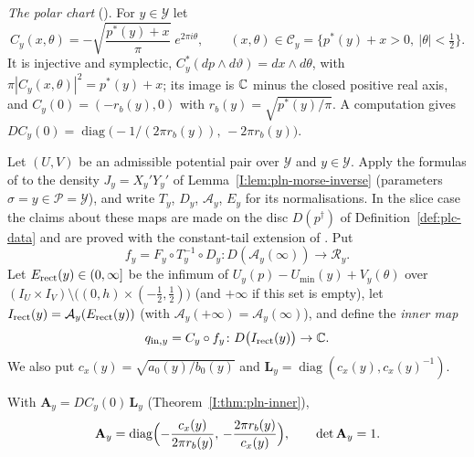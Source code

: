 \emph{The polar chart} (). For $y\in\mathcal Y$ let
\begin{equation}\label{eq:q-pln-chart}
 C_y(x,\theta)=-\sqrt{\frac{p^*(y)+x}\pi}\;e^{2\pi i\theta},\qquad
 (x,\theta)\in\mathcal C_y=\{p^*(y)+x>0,\ |\theta|<\tfrac12\}.
\end{equation}
It is injective and symplectic, $C_y^*(dp\wedge d\vartheta)=dx\wedge d\theta$, with $\pi|C_y(x,\theta)|^2=p^*(y)+x$; its image
is $\mathbb{C}$ minus the closed positive real axis, and $C_y(0)=(-r_b(y),0)$ with $r_b(y)=\sqrt{p^*(y)/\pi}$. A computation gives
$DC_y(0)=\operatorname{diag}\bigl(-1/(2\pi r_b(y)),\,-2\pi r_b(y)\bigr)$.

\begin{definition}\label{I:def:pln-inner-map}
Let $(U,V)$ be an admissible potential pair over $\mathcal Y$ and $y\in\mathcal Y$. Apply
the formulas of  to the density $J_y=X_y'Y_y'$ of Lemma~\ref{I:lem:pln-morse-inverse}
(parameters $\sigma=y\in\mathcal P=\mathcal Y$), and write $T_y$, $D_y$, $\mathcal A_y$, $E_y$ for its normalisations. In the slice case the claims about these maps are made on the disc $D(p^\dagger)$ of Definition~\ref{def:plc-data}
and are proved with the constant-tail extension of . Put
\[
 f_y=F_y\circ T_y^{-1}\circ D_y\colon D(\mathcal A_y(\infty))\to\mathcal R_y .
\]
Let $E_{\rm rect}(y)\in(0,\infty]$ be the infimum of $U_y(p)-U_{\min}(y)+V_y(\theta)$ over
$(I_U\times I_V)\setminus\bigl((0,h)\times(-\frac12,\frac12)\bigr)$ (and $+\infty$ if this set is empty), let
$I_{\rm rect}(y)=\mathcal A_y(E_{\rm rect}(y))$ (with $\mathcal A_y(+\infty)=\mathcal A_y(\infty)$), and define the
\emph{inner map}
\[
 q_{{\rm in},y}=C_y\circ f_y\colon D\bigl(I_{\rm rect}(y)\bigr)\to\mathbb{C} .
\]
We also put $c_x(y)=\sqrt{a_0(y)/b_0(y)}$ and $\mathbf L_y=\operatorname{diag}(c_x(y),c_x(y)^{-1})$.
\end{definition}

With $\mathbf A_y=DC_y(0)\,\mathbf L_y$ (Theorem~\ref{I:thm:pln-inner}),
\begin{equation}\label{eq:q-pln-A0}
 \mathbf A_y=\operatorname{diag}\Bigl(-\frac{c_x(y)}{2\pi r_b(y)},\,-\frac{2\pi r_b(y)}{c_x(y)}\Bigr),\qquad\det\mathbf A_y=1.
\end{equation}

